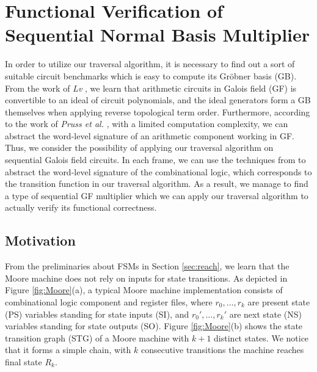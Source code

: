 \chapter{Functional Verification of Sequential Normal Basis Multiplier}
\label{ch:normal}
In order to utilize our traversal algorithm, it is necessary to find out
a sort of suitable circuit benchmarks which is easy to compute its
Gr\"obner basis (GB). From the work of {\it Lv} \cite{lv:phd},
we learn that arithmetic circuits in Galois field (GF) is
convertible to an ideal of circuit polynomials, and the 
ideal generators form a GB themselves when applying reverse topological
term order. Furthermore, according to the work of {\it Pruss et al.}
\cite{pruss:tcad15}, with a limited computation complexity,
we can abstract the word-level signature of an arithmetic 
component working in GF. Thus, we consider the possibility 
of applying our traversal algorithm on sequential Galois
field circuits. In each frame, we can use the techniques 
from \cite{pruss:tcad15} to abstract the word-level
signature of the combinational logic, which corresponds
to the transition function in our traversal algorithm.
As a result, we manage to find a type of sequential GF multiplier
which we can apply our traversal algorithm to actually 
verify its functional correctness.

\section{Motivation}
\label{sec:normal_motiv}
From the preliminaries about FSMs in Section \ref{sec:reach}, we learn that the
Moore machine does not rely on inputs for state transitions. 
As depicted in Figure \ref{fig:Moore}(a), a typical Moore machine implementation
consists of combinational logic component and register files, where
$r_0,\dots,r_k$ are present state (PS) variables 
standing for state inputs (SI), and $r_0',\dots,r_k'$ are next state (NS) variables standing for
state outputs (SO). Figure \ref{fig:Moore}(b) shows the state transition graph (STG) of 
a Moore machine with $k+1$ distinct states. We notice that it forms a simple chain,
with $k$ consecutive transitions the machine reaches final state $R_k$.

\begin{figure}[H]
\end{figure}

